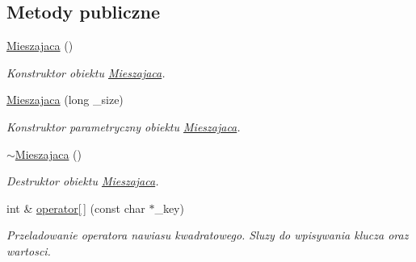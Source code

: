 \subsection*{Metody publiczne}
\begin{DoxyCompactItemize}
\item 
\hyperlink{class_mieszajaca_ab500c9ba068fbe15f9aa05d83df500ed}{Mieszajaca} ()
\begin{DoxyCompactList}\small\item\em Konstruktor obiektu \hyperlink{class_mieszajaca}{Mieszajaca}. \end{DoxyCompactList}\item 
\hyperlink{class_mieszajaca_a057f62fac3404b4748b4b38dbfc25cc2}{Mieszajaca} (long \-\_\-size)
\begin{DoxyCompactList}\small\item\em Konstruktor parametryczny obiektu \hyperlink{class_mieszajaca}{Mieszajaca}. \end{DoxyCompactList}\item 
\hyperlink{class_mieszajaca_a66a712ce4807c9330ae36f6561101a57}{$\sim$\-Mieszajaca} ()
\begin{DoxyCompactList}\small\item\em Destruktor obiektu \hyperlink{class_mieszajaca}{Mieszajaca}. \end{DoxyCompactList}\item 
int \& \hyperlink{class_mieszajaca_a1ebf1b83245c5212e4e60d1bad1ac812}{operator\mbox{[}$\,$\mbox{]}} (const char $\ast$\-\_\-key)
\begin{DoxyCompactList}\small\item\em Przeladowanie operatora nawiasu kwadratowego. Sluzy do wpisywania klucza oraz wartosci. \end{DoxyCompactList}\end{DoxyCompactItemize}
